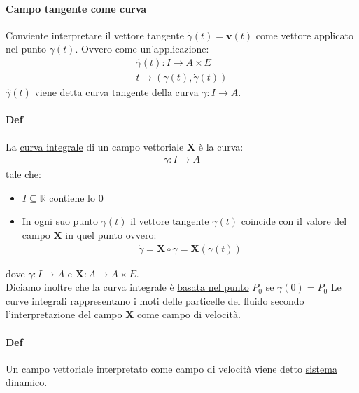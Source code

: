 \paragraph{Campo tangente come curva} Conviente interpretare il vettore tangente $\dot{\gamma}(t)=\mathbf{v}(t)$ come vettore applicato nel punto $\gamma(t)$. Ovvero come un'applicazione:
\begin{align*}
    \hat{\gamma}(t)\colon I \to A\times E\\
    t\mapsto (\gamma(t),\dot{\gamma}(t))
\end{align*}
$\hat{\gamma}(t)$ viene detta \underline{curva tangente} della curva $\gamma\colon I \to A$.
\paragraph{Def} La \underline{curva integrale} di un campo vettoriale $\mathbf{X}$ è la curva:
\begin{align*}
    \gamma \colon I \to A
\end{align*}
tale che:
\begin{itemize}
    \item $I\subseteq \mathbb{R}$ contiene lo $0$
    \item In ogni suo punto $\gamma(t)$ il vettore tangente $\dot{\gamma}(t)$ coincide con il valore del campo $\mathbf{X}$ in quel punto ovvero:
    \begin{align*}
        \dot{\gamma}=\mathbf{X}\circ \gamma=\mathbf{X}(\gamma(t))
    \end{align*}
\end{itemize}
dove $\gamma\colon I \to A$ e $\mathbf{X}\colon A \to A\times E$.\\
Diciamo inoltre che la curva integrale è \underline{basata nel punto} $P_0$ se $\gamma(0)=P_0$
Le curve integrali rappresentano i moti delle particelle del fluido secondo l'interpretazione del campo $\mathbf{X}$ come campo di velocità.\\
\paragraph{Def} Un campo vettoriale interpretato come campo di velocità viene detto \underline{sistema dinamico}.

